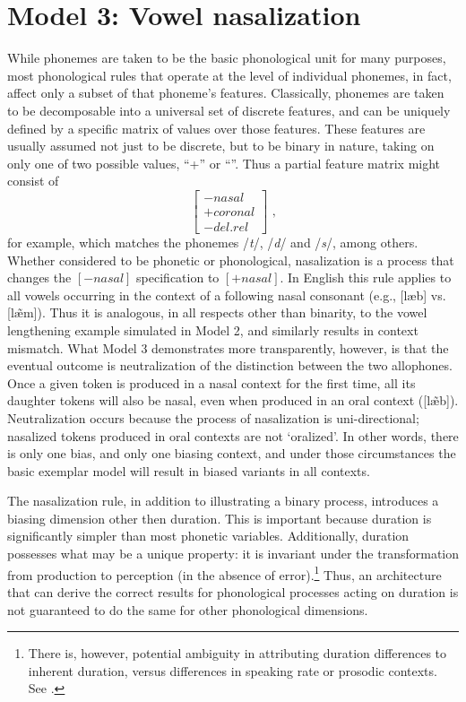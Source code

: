 \section{\label{subsec:Model-3:-Nasalization}Model 3: Vowel nasalization}

While phonemes are taken to be the basic phonological unit for many
purposes, most phonological rules that operate at the level of individual
phonemes, in fact, affect only a subset of that phoneme's features.
Classically, phonemes are taken to be decomposable into a universal
set of discrete features, and can be uniquely defined by a specific
matrix of values over those features. These features are usually assumed
not just to be discrete, but to be binary in nature, taking on only
one of two possible values, “+” or “\textminus”. Thus a partial
feature matrix might consist of 
\[\left[\begin{array}{c}
-\textit{nasal}\\
+\textit{coronal}\\
-\textit{del.rel}
\end{array}\right]\text{ ,}\]
for example, which matches the phonemes /\emph{t}/, /\emph{d}/\emph{
}and /\emph{s}/, among others. Whether considered to be phonetic or
phonological, nasalization is a process that changes the $\left[-\textit{nasal}\right]$
specification to $\left[+\textit{nasal}\right]$. In English this rule applies
to all vowels occurring in the context of a following nasal consonant
(e.g., {[læb]} vs. {[læ̃m]}). Thus it is analogous,
in all respects other than binarity, to the vowel lengthening example
simulated in Model 2, and similarly results in context mismatch. What
Model 3 demonstrates more transparently, however, is that the eventual
outcome is neutralization of the distinction between the two allophones.
Once a given token is produced in a nasal context for the first time,
all its daughter tokens will also be nasal, even when produced in
an oral context ({[læ̃b]}). Neutralization occurs because
the process of nasalization is uni-directional; nasalized tokens produced
in oral contexts are not `oralized'. In other words, there is only
one bias, and only one biasing context, and under those circumstances
the basic exemplar model will result in biased variants in all contexts.

The nasalization rule, in addition to illustrating a binary process,
introduces a biasing dimension other then duration. This is important
because duration is significantly simpler than most phonetic variables.
Additionally, duration possesses what may be a unique property: it
is invariant under the transformation from production to perception
(in the absence of error).\footnote{There is, however, potential ambiguity in attributing duration differences
to inherent duration, versus differences in speaking rate or prosodic
contexts. See . } Thus, an architecture that can derive the correct results for phonological
processes acting on duration is not guaranteed to do the same for
other phonological dimensions. 


